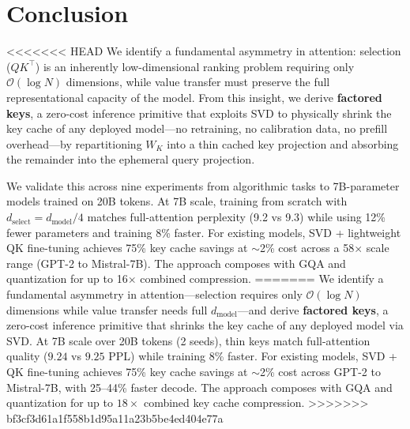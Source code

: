 \documentclass{article} %
\newcommand{\dmodel}{d_{\text{model}}}
\newcommand{\dselect}{d_{\text{select}}}
\newcommand{\BigO}{\mathcal{O}}
\begin{document}
\section{Conclusion}

<<<<<<< HEAD
We identify a fundamental asymmetry in attention: selection ($QK^\top$) is an inherently low-dimensional ranking problem requiring only $\BigO(\log N)$ dimensions, while value transfer must preserve the full representational capacity of the model. From this insight, we derive \textbf{factored keys}, a zero-cost inference primitive that exploits SVD to physically shrink the key cache of any deployed model---no retraining, no calibration data, no prefill overhead---by repartitioning $W_K$ into a thin cached key projection and absorbing the remainder into the ephemeral query projection.

We validate this across nine experiments from algorithmic tasks to 7B-parameter models trained on 20B tokens. At 7B scale, training from scratch with $\dselect = \dmodel/4$ matches full-attention perplexity (9.2 vs 9.3) while using 12\% fewer parameters and training 8\% faster. For existing models, SVD + lightweight QK fine-tuning achieves 75\% key cache savings at $\sim$2\% cost across a 58$\times$ scale range (GPT-2 to Mistral-7B). The approach composes with GQA and quantization for up to 16$\times$ combined compression.
=======
We identify a fundamental asymmetry in attention---selection requires only $\BigO(\log N)$ dimensions while value transfer needs full $\dmodel$---and derive \textbf{factored keys}, a zero-cost inference primitive that shrinks the key cache of any deployed model via SVD. At 7B scale over 20B tokens (2 seeds), thin keys match full-attention quality ($9.24$ vs $9.25$ PPL) while training 8\% faster. For existing models, SVD + QK fine-tuning achieves 75\% key cache savings at $\sim$2\% cost across GPT-2 to Mistral-7B, with 25--44\% faster decode. The approach composes with GQA and quantization for up to $18\times$ combined key cache compression.
>>>>>>> bf3cf3d61a1f558b1d95a11a23b5be4ed404e77a
\end{document}
